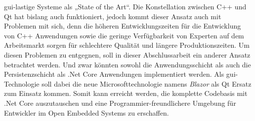 \ac{gui}-lastige Systeme als „State of the Art“.
\newline
\newline
Die Konstellation zwischen C++ und Qt hat bislang auch funktioniert, jedoch kommt dieser Ansatz
auch mit Problemen mit sich, denn die höheren Entwicklungszeiten für die Entwicklung von C++
Anwendungen sowie die geringe Verfügbarkeit von Experten auf dem Arbeitsmarkt sorgen für
schlechtere Qualität und längere Produktionszeiten.
\newline
\newline
Um diesen Problemen zu entgegnen, soll in dieser Abschlussarbeit ein anderer Ansatz betrachtet
werden. Und zwar könnten sowohl die Anwendungsschicht als auch die Persistenzschicht als .Net
Core Anwendungen implementiert werden. Als \ac{gui}-Technologie soll dabei die neue
Microsofttechnologie namens \emph{Blazor} als Qt Ersatz zum Einsatz kommen. Somit kann erreicht
werden, die komplette Codebasis mit .Net Core auszutauschen und eine Programmier-freundlichere
Umgebung für Entwickler im Open Embedded Systems zu erschaffen.



